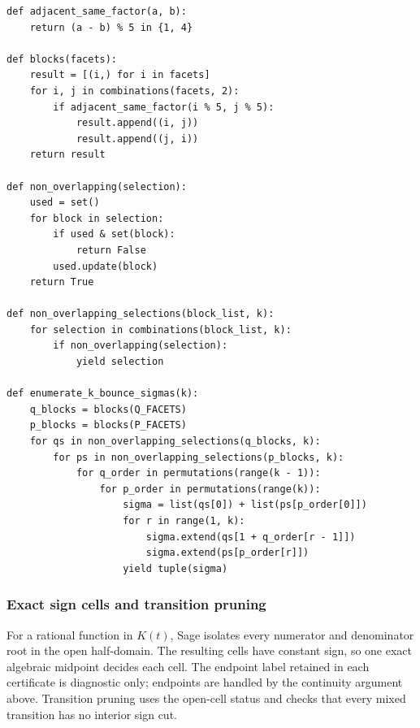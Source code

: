 {\small
\begin{verbatim}
def adjacent_same_factor(a, b):
    return (a - b) % 5 in {1, 4}

def blocks(facets):
    result = [(i,) for i in facets]
    for i, j in combinations(facets, 2):
        if adjacent_same_factor(i % 5, j % 5):
            result.append((i, j))
            result.append((j, i))
    return result

def non_overlapping(selection):
    used = set()
    for block in selection:
        if used & set(block):
            return False
        used.update(block)
    return True

def non_overlapping_selections(block_list, k):
    for selection in combinations(block_list, k):
        if non_overlapping(selection):
            yield selection

def enumerate_k_bounce_sigmas(k):
    q_blocks = blocks(Q_FACETS)
    p_blocks = blocks(P_FACETS)
    for qs in non_overlapping_selections(q_blocks, k):
        for ps in non_overlapping_selections(p_blocks, k):
            for q_order in permutations(range(k - 1)):
                for p_order in permutations(range(k)):
                    sigma = list(qs[0]) + list(ps[p_order[0]])
                    for r in range(1, k):
                        sigma.extend(qs[1 + q_order[r - 1]])
                        sigma.extend(ps[p_order[r]])
                    yield tuple(sigma)
\end{verbatim}
}

\subsubsection*{Exact sign cells and transition pruning}
For a rational function in \(K(t)\), Sage isolates every numerator and
denominator root in the open half-domain.  The resulting cells have constant
sign, so one exact algebraic midpoint decides each cell.  The endpoint label
retained in each certificate is diagnostic only; endpoints are handled by the
continuity argument above.  Transition pruning uses the open-cell status and
checks that every mixed transition has no interior sign cut.

